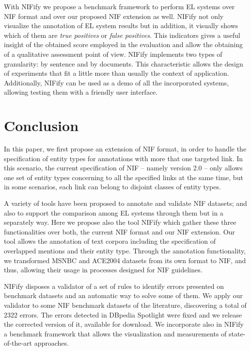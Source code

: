 \documentclass[sigconf]{acmart}
\begin{document}
With NIFify we propose a benchmark framework to perform EL systems over NIF format and over our proposed NIF extension as well. NIFify not only visualize the annotation of EL system results but in addition, it visually shows which of them are \textit{true positives} or \textit{false positives}. This indicators gives a useful insight of the obtained score employed in the evaluation and allow the obtaining of a qualitative assessment point of view. NIFify implements two types of granularity: by sentence and by documents. This characteristic allows the design of experiments that fit a little more than usually the context of application. Additionally, NIFify can be used as a demo of all the incorporated systems, allowing testing them with a friendly user interface.


\section{Conclusion} 
\label{sec:conclusion}
In this paper, we first propose an extension of NIF format, in order to handle the specification of entity types for annotations with more that one targeted link. In this scenario, the current specification of NIF -- namely version 2.0 -- only allows one set of entity types concerning to all the specified links at the same time, but in some scenarios, each link can belong to disjoint classes of entity types. 

A variety of tools have been proposed to annotate and validate NIF datasets; and also to support the comparison among EL systems through them but in a separately way. Here we propose also the tool NIFify which gather these three functionalities over both, the current NIF format and our NIF extension. Our tool allows the annotation of text corpora including the specification of overlapped mentions and their entity type. Through the annotation functionality, we transformed MSNBC and ACE2004 datasets from its own format to NIF, and thus, allowing their usage in processes designed for NIF guidelines.

NIFify disposes a validator of a set of rules to identify errors presented on benchmark datasets and an automatic way to solve some of them. We apply our validator to some NIF benchmark datasets of the literature, discovering a total of 2322 errors. The errors detected in DBpedia Spotlight were fixed and we release the corrected version of it, available for download. We incorporate also in NIFify a benchmark framework that allows the visualization and measurements of state-of-the-art approaches.
\end{document}
